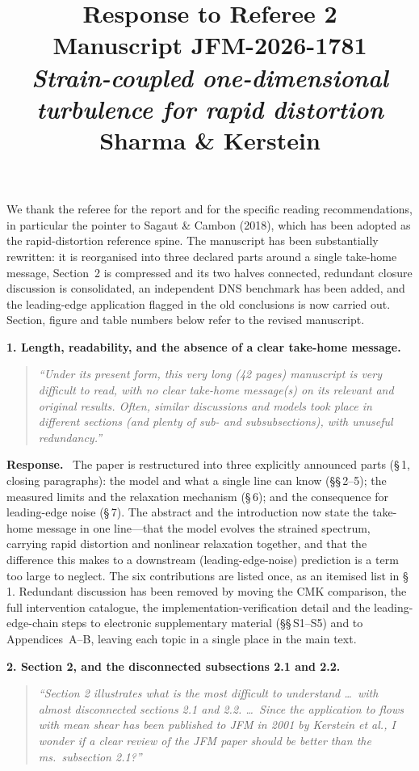 \documentclass[11pt]{article}
\title{Response to Referee 2\\[2pt]
\large Manuscript JFM-2026-1781\\
\emph{Strain-coupled one-dimensional turbulence for rapid distortion}\\
Sharma \& Kerstein}
\date{}
\newenvironment{refcomment}%
  {\begin{quote}\color{commentgray}\itshape}%
  {\end{quote}}
\newcommand{\response}{\medskip\noindent\textbf{Response.}\ }
\newcommand{\point}[1]{\bigskip\noindent\textbf{#1}}
\begin{document}
\maketitle

We thank the referee for the report and for the specific reading
recommendations, in particular the pointer to Sagaut \& Cambon (2018),
which has been adopted as the rapid-distortion reference spine. The
manuscript has been substantially rewritten: it is reorganised into three
declared parts around a single take-home message, Section~2 is compressed
and its two halves connected, redundant closure discussion is consolidated,
an independent DNS benchmark has been added, and the leading-edge
application flagged in the old conclusions is now carried out. Section,
figure and table numbers below refer to the revised manuscript.

\point{1. Length, readability, and the absence of a clear take-home
message.}
\begin{refcomment}
``Under its present form, this very long (42 pages) manuscript is very
difficult to read, with no clear take-home message(s) on its relevant and
original results. Often, similar discussions and models took place in
different sections (and plenty of sub- and subsubsections), with unuseful
redundancy.''
\end{refcomment}

\response
The paper is restructured into three explicitly announced parts (\S\,1,
closing paragraphs): the model and what a single line can know
(\S\S\,2--5); the measured limits and the relaxation mechanism (\S\,6); and
the consequence for leading-edge noise (\S\,7). The abstract and the
introduction now state the take-home message in one line---that the model
evolves the strained spectrum, carrying rapid distortion and nonlinear
relaxation together, and that the difference this makes to a downstream
(leading-edge-noise) prediction is a term too large to neglect. The
six contributions are listed once, as an itemised list in \S\,1. Redundant
discussion has been removed by moving the CMK comparison, the full
intervention catalogue, the implementation-verification detail and the
leading-edge-chain steps to electronic supplementary material (\S\S\,S1--S5)
and to Appendices~A--B, leaving each topic in a single place in the main
text.

\point{2. Section 2, and the disconnected subsections 2.1 and 2.2.}
\begin{refcomment}
``Section 2 illustrates what is the most difficult to understand \ldots\
with almost disconnected sections 2.1 and 2.2. \ldots\ Since the
application to flows with mean shear has been published to JFM in 2001 by
Kerstein et al., I wonder if a clear review of the JFM paper should be
better than the ms.\ subsection 2.1?''
\end{refcomment}
\end{document}

